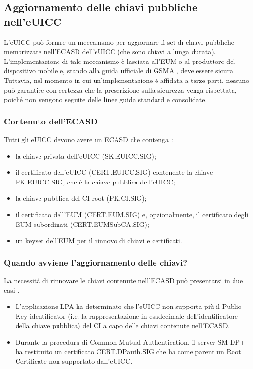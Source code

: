 \documentclass[10pt, oneside]{book}
\begin{document}
\subsection{Aggiornamento delle chiavi pubbliche nell'eUICC}
L'eUICC può fornire un meccanismo per aggiornare il set di chiavi pubbliche memorizzate nell'ECASD dell'eUICC (che sono chiavi a lunga durata). L'implementazione di tale meccanismo è lasciata all'EUM o al produttore del dispositivo mobile e, stando alla guida ufficiale di GSMA \cite{GSMA-docs-new}, deve essere sicura. Tuttavia, nel momento in cui un'implementazione è affidata a terze parti, nessuno può garantire con certezza che la prescrizione sulla sicurezza venga rispettata, poiché non vengono seguite delle linee guida standard e consolidate.

\subsubsection{Contenuto dell'ECASD}
Tutti gli eUICC devono avere un ECASD che contenga \cite{GSMA-docs-new}:
\begin{itemize}[itemsep=0pt]
\item la chiave privata dell'eUICC (SK.EUICC.SIG);
\item il certificato dell'eUICC (CERT.EUICC.SIG) contenente la chiave PK.EUICC.SIG, che è la chiave pubblica dell'eUICC;
\item la chiave pubblica del CI root (PK.CI.SIG);
\item il certificato dell'EUM (CERT.EUM.SIG) e, opzionalmente, il certificato degli EUM subordinati (CERT.EUMSubCA.SIG);
\item un keyset dell'EUM per il rinnovo di chiavi e certificati.
\end{itemize}

\subsubsection{Quando avviene l'aggiornamento delle chiavi?}
La necessità di rinnovare le chiavi contenute nell'ECASD può presentarsi in due casi \cite{GSMA-docs-new}.
\begin{itemize}
\item L'applicazione LPA ha determinato che l'eUICC non supporta più il Public Key identificator (i.e. la rappresentazione in esadecimale dell'identificatore della chiave pubblica) del CI a capo delle chiavi contenute nell'ECASD.
\item Durante la procedura di Common Mutual Authentication, il server SM-DP+ ha restituito un certificato CERT.DPauth.SIG che ha come parent un Root Certificate non supportato dall'eUICC.
\end{itemize}
\end{document}
